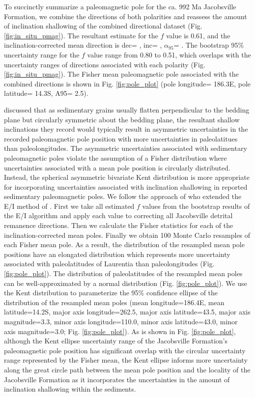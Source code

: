 \documentclass[draft]{agujournal2019}
\begin{document}
To succinctly summarize a paleomagnetic pole for the ca. 992 Ma Jacobsville Formation, we combine the directions of both polarities and reassess the amount of inclination shallowing of the combined directional dataset (Fig. \ref{fig:in_situ_pmag}). The resultant estimate for the $f$ value is 0.61, and the inclination-corrected mean direction is dec= , inc= , $\alpha_{95}$= . The bootstrap 95\% uncertainty range for the $f$ value range from 0.80 to 0.51, which overlaps with the uncertainty ranges of directions associated with each polarity (Fig. \ref{fig:in_situ_pmag}). The Fisher mean paleomagnetic pole associated with the combined directions is shown in Fig. \ref{fig:pole_plot} (pole longitude= 186.3\textdegree E, pole latitude= 14.3\textdegree S, A95= 2.5\textdegree). 

 discussed that as sedimentary grains usually flatten perpendicular to the bedding plane but circularly symmetric about the bedding plane, the resultant shallow inclinations they record would typically result in asymmetric uncertainties in the recorded paleomagnetic pole position with more uncertainties in paleolatitues than paleolongitudes. The asymmetric uncertainties associated with sedimentary paleomagnetic poles violate the assumption of a Fisher distribution \cite{Fisher1953a} where uncertainties associated with a mean pole position is circularly distributed. Instead, the spherical asymmetric bivariate Kent distribution \cite{Kent1983a} is more appropriate for incorporating uncertainties associated with inclination shallowing in reported sedimentary paleomagnetic poles. We follow the approach of  who extended the E/I method of . First we take all estimated $f$ values from the bootstrap results of the E/I algorithm and apply each value to correcting all Jacobsville detrital remanence directions. Then we calculate the Fisher statistics for each of the inclination-corrected mean poles. Finally we obtain 100 Monte Carlo resamples of each Fisher mean pole. As a result, the distribution of the resampled mean pole positions have an elongated distribution which represents more uncertainty associated with paleolatitudes of Laurentia than paleolongitudes (Fig. \ref{fig:pole_plot}). The distribution of paleolatitudes of the resampled mean poles can be well-approximated by a normal distribution (Fig. \ref{fig:pole_plot}). We use the Kent distribution to parameterize the 95\% confidence ellipse of the distribution of the resampled mean poles (mean longitude=186.4\textdegree E, mean latitude=14.2\textdegree S, major axis longitude=262.5, major axis latitude=43.5, major axis magnitude=3.3\textdegree, minor axis longitude=110.0, minor axis latitude=43.0, minor axis magnitude=3.0\textdegree; Fig. \ref{fig:pole_plot}). As is shown in Fig. \ref{fig:pole_plot}, although the Kent ellipse uncertainty range of the Jacobsville Formation's paleomagnetic pole position has significant overlap with the circular uncertainty range represented by the Fisher mean, the Kent ellipse informs more uncertainty along the great circle path between the mean pole position and the locality of the Jacobsville Formation as it incorporates the uncertainties in the amount of inclination shallowing within the sediments. 
\end{document}
